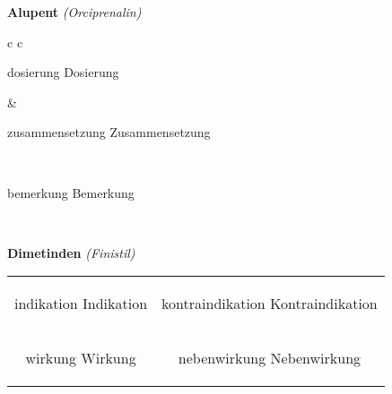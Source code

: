 \documentclass[12pt]{beamer}
\begin{document}
\begin{frame}{
    \textbf{Alupent}
    \textit{(Orciprenalin)}
}
    \begin{tabular}{c c}
        \begin{beamercolorbox}[wd=\boxwidth\textwidth,ht=\boxheight\textheight,sep=1em]{dosierung}
        Dosierung
        \end{beamercolorbox} & 
        \begin{beamercolorbox}[wd=\boxwidth\textwidth,ht=\boxheight\textheight,sep=1em]{zusammensetzung}
        Zusammensetzung
        \end{beamercolorbox} \\
        \begin{beamercolorbox}[wd=\textwidth,ht=\boxheight\textheight,sep=1em]{bemerkung}
        Bemerkung
        \end{beamercolorbox} \\
    \end{tabular}
\end{frame}

\begin{frame}{
    \textbf{Dimetinden}
    \textit{(Finistil)}
}
    \begin{tabular}{c c}
        \begin{beamercolorbox}[wd=\boxwidth\textwidth,ht=\boxheight\textheight,sep=1em]{indikation}
        Indikation
        \end{beamercolorbox} & 
        \begin{beamercolorbox}[wd=\boxwidth\textwidth,ht=\boxheight\textheight,sep=1em]{kontraindikation}
        Kontraindikation 
        \end{beamercolorbox} \\
        \begin{beamercolorbox}[wd=\boxwidth\textwidth,ht=\boxheight\textheight,sep=1em]{wirkung}
        Wirkung
        \end{beamercolorbox} & 
        \begin{beamercolorbox}[wd=\boxwidth\textwidth,ht=\boxheight\textheight,sep=1em]{nebenwirkung}
        Nebenwirkung
        \end{beamercolorbox} \\
    \end{tabular}
\end{frame}
\end{document}
